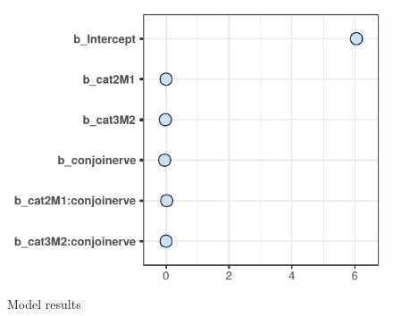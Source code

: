 \begin{figure}[hbt!]
\centering
\begin{knitrout}
\color{fgcolor}
\includegraphics[]{experiments/selfpaced/report/figure/thirdplot-1.pdf} 

\end{knitrout}
\caption{Model results}
\label{fig:modelresults}
\end{figure}

